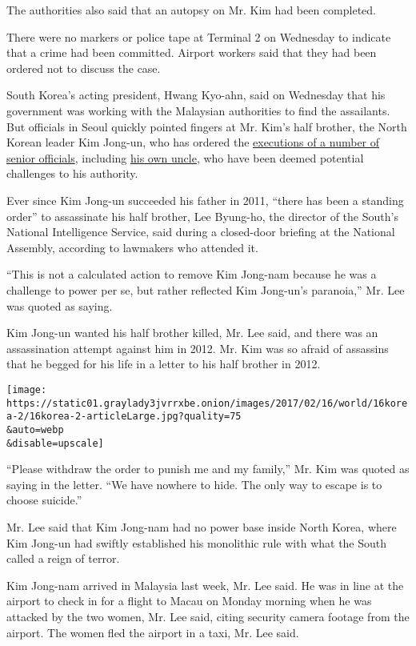 The authorities also said that an autopsy on Mr. Kim had been completed.

There were no markers or police tape at Terminal 2 on Wednesday to
indicate that a crime had been committed. Airport workers said that they
had been ordered not to discuss the case.

South Korea's acting president, Hwang Kyo-ahn, said on Wednesday that
his government was working with the Malaysian authorities to find the
assailants. But officials in Seoul quickly pointed fingers at Mr. Kim's
half brother, the North Korean leader Kim Jong-un, who has ordered the
\href{https://www.nytimes3xbfgragh.onion/2015/04/30/world/asia/north-korea-executed-15-top-officials-in-2015-south-korean-agency-says.html}{executions
of a number of senior officials}, including
\href{http://www.nytimes3xbfgragh.onion/2013/12/24/world/asia/north-korea-purge.html}{his
own uncle}, who have been deemed potential challenges to his authority.

Ever since Kim Jong-un succeeded his father in 2011, ``there has been a
standing order'' to assassinate his half brother, Lee Byung-ho, the
director of the South's National Intelligence Service, said during a
closed-door briefing at the National Assembly, according to lawmakers
who attended it.

``This is not a calculated action to remove Kim Jong-nam because he was
a challenge to power per se, but rather reflected Kim Jong-un's
paranoia,'' Mr. Lee was quoted as saying.

Kim Jong-un wanted his half brother killed, Mr. Lee said, and there was
an assassination attempt against him in 2012. Mr. Kim was so afraid of
assassins that he begged for his life in a letter to his half brother in
2012.

\texttt{[image: https://static01.graylady3jvrrxbe.onion/images/2017/02/16/world/16korea-2/16korea-2-articleLarge.jpg?quality=75\\\&auto=webp\\\&disable=upscale]}

``Please withdraw the order to punish me and my family,'' Mr. Kim was
quoted as saying in the letter. ``We have nowhere to hide. The only way
to escape is to choose suicide.''

Mr. Lee said that Kim Jong-nam had no power base inside North Korea,
where Kim Jong-un had swiftly established his monolithic rule with what
the South called a reign of terror.

Kim Jong-nam arrived in Malaysia last week, Mr. Lee said. He was in line
at the airport to check in for a flight to Macau on Monday morning when
he was attacked by the two women, Mr. Lee said, citing security camera
footage from the airport. The women fled the airport in a taxi, Mr. Lee
said.

